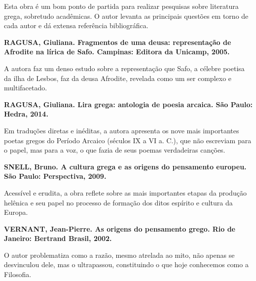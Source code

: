 \documentclass[12pt]{extarticle}
\begin{document}
Esta obra é um bom ponto de partida para realizar pesquisas sobre
literatura grega, sobretudo acadêmicas. O autor levanta as principais
questões em torno de cada autor e dá extensa referência bibliográfica.

\textbf{RAGUSA, Giuliana. Fragmentos de uma deusa: representação de
Afrodite na lírica de Safo. Campinas: Editora da Unicamp, 2005. }

A autora faz um denso estudo sobre a representação que Safo, a célebre
poetisa da ilha de Lesbos, faz da deusa Afrodite, revelada como um ser
complexo e multifacetado.

\textbf{RAGUSA, Giuliana. Lira grega: antologia de poesia arcaica. São
Paulo: Hedra, 2014.}

Em traduções diretas e inéditas, a autora apresenta os nove mais
importantes poetas gregos do Período Arcaico (séculos IX a VI a. C.),
que não escreviam para o papel, mas para a voz, o que fazia de seus
poemas verdadeiras canções.

\textbf{SNELL, Bruno. A cultura grega e as origens do pensamento
europeu. São Paulo: Perspectiva, 2009.}

Acessível e erudita, a obra reflete sobre as mais importantes etapas da
produção helênica e seu papel no processo de formação dos ditos espírito
e cultura da Europa.

\textbf{VERNANT, Jean-Pierre. As origens do pensamento grego. Rio de
Janeiro: Bertrand Brasil, 2002.}

O autor problematiza como a razão, mesmo atrelada ao mito, não apenas se
desvinculou dele, mas o ultrapassou, constituindo o que hoje conhecemos
como a Filosofia.
\end{document}
